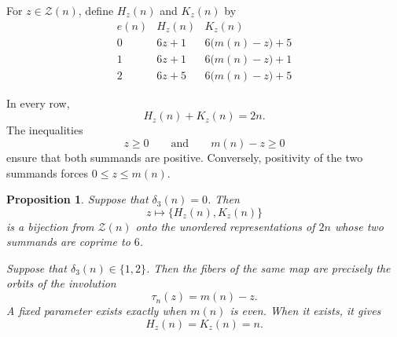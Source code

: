 \documentclass[12pt]{article}
\numberwithin{equation}{section}
\newtheorem{proposition}[theorem]{Proposition}
\theoremstyle{definition}
\theoremstyle{remark}
\newcommand{\Zcal}{\mathcal Z}
\begin{document}
For $z\in\Zcal(n)$, define $H_z(n)$ and $K_z(n)$ by
\begin{equation}
\label{eq:parametrization-table}
\begin{array}{c|c|c}
e(n) & H_z(n) & K_z(n)\\
\hline
0
&
6z+1
&
6\bigl(m(n)-z\bigr)+5
\\[4pt]
1
&
6z+1
&
6\bigl(m(n)-z\bigr)+1
\\[4pt]
2
&
6z+5
&
6\bigl(m(n)-z\bigr)+5
\end{array}
\end{equation}

In every row,
\begin{equation}
\label{eq:parametrization-sum}
H_z(n)+K_z(n)=2n.
\end{equation}
The inequalities
\[
z\geq0
\qquad\text{and}\qquad
m(n)-z\geq0
\]
ensure that both summands are positive. Conversely, positivity
of the two summands forces $0\leq z\leq m(n)$.

\begin{proposition}
\label{prop:six-wheel}
Suppose that $\delta_3(n)=0$. Then
\[
z\longmapsto\{H_z(n),K_z(n)\}
\]
is a bijection from $\Zcal(n)$ onto the unordered
representations of $2n$ whose two summands are coprime to $6$.

Suppose that $\delta_3(n)\in\{1,2\}$. Then the fibers of the same
map are precisely the orbits of the involution
\[
\tau_n(z)=m(n)-z.
\]
A fixed parameter exists exactly when $m(n)$ is even. When it
exists, it gives
\[
H_z(n)=K_z(n)=n.
\]
\end{proposition}
\end{document}
